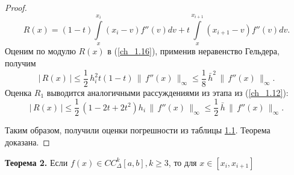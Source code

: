 ﻿\documentclass[a4paper,14pt]{extreport}
\newcommand{\RNumb}[1]{\uppercase\expandafter{\romannumeral #1\relax}}
\begin{document}
\begin{proof}
        \begin{equation}
            \label{ch_1.16}
            R(x)=(1-t) \int\limits_{x}^{x_{i}}(x_{i}-v) f''(v) dv+t \int\limits_{x}^{x_{i+1}}(x_{i+1}-v) f''(v) dv.
        \end{equation}
         Оценим по модулю $R(x)$ в (\ref{ch_1.16}), применив неравенство Гельдера, получим
         \begin{equation}
            \label{ch_1.17}
            |\,R(x)\,|\leqslant\dfrac12\,h_i^2t(1-t)\,\|\,f''(x)\,\|_\infty\leqslant\dfrac18\,\bar{h}^2\,\|\,f''(x)\,\|_\infty.
        \end{equation}
        Оценка $R_1$ выводится аналогичными рассуждениями из \RNumb{3} этапа из (\ref{ch_1.12}):
        \begin{equation}
            \label{ch_1.18}
            |\,R(x)\,|\leqslant\dfrac12\,(1-2t+2t^2)h_i\,\|\,f''(x)\,\|_\infty\leqslant\dfrac12\,\bar{h}\,\|\,f''(x)\,\|_\infty.
        \end{equation}
        \par Таким образом, получили оценки погрешности из таблицы \hyperref[table_1]{1.1}. Теорема доказана.
    \end{proof}
    \par\noindent\textbf{Теорема 2.}
    Если $f(x) \in C C_{\Delta}^{k}[a, b], k \geqslant 3$, то для $x \in\left[x_{i}, x_{i+1}\right]$
\end{document}
